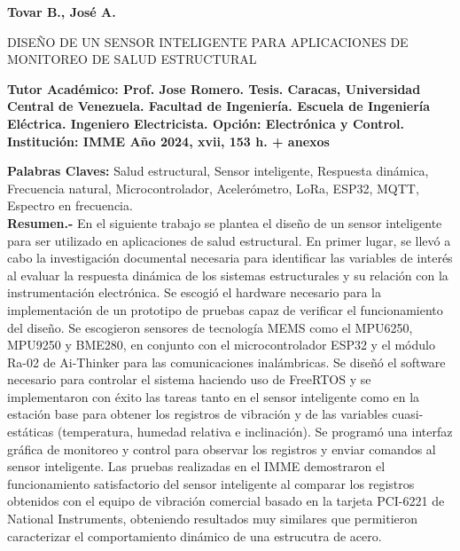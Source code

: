 \documentclass[letterpaper,titlepage,12pt,oneside,spanish,final]{report_eie}
\begin{document}
\newpage
\renewcommand*{\abstract}{\begin{center}\end{center}}
\begin{spacing}{1}
\begin{center}%

\textbf{Tovar B., José A.}

\begin{large}
DISEÑO DE UN SENSOR INTELIGENTE PARA APLICACIONES DE MONITOREO DE SALUD ESTRUCTURAL
\end{large}
\end{center}

\noindent%
\textbf{Tutor Académico: Prof. Jose Romero. Tesis.
Caracas, Universidad Central de Venezuela. Facultad de Ingeniería.
Escuela de Ingeniería Eléctrica. Ingeniero Electricista. Opción: Electrónica y Control. Institución: IMME Año 2024,
xvii, 153 h. + anexos}

\noindent
\textbf{Palabras Claves:} Salud estructural, Sensor inteligente,  Respuesta dinámica, Frecuencia natural, Microcontrolador, Acelerómetro, LoRa, ESP32, MQTT, Espectro en frecuencia. \\[1ex]

\noindent \textbf{Resumen.-} En el siguiente trabajo se plantea el diseño de un sensor inteligente para ser utilizado en aplicaciones de salud estructural. En primer lugar, se llevó a cabo la investigación documental necesaria para identificar las variables de interés al evaluar la respuesta dinámica de los sistemas estructurales y su relación con la instrumentación electrónica. Se escogió el hardware necesario para la implementación de un prototipo de pruebas capaz de verificar el funcionamiento del diseño. Se escogieron sensores de tecnología MEMS como el MPU6250, MPU9250 y BME280, en conjunto con el microcontrolador ESP32 y el módulo Ra-02 de Ai-Thinker para las comunicaciones inalámbricas. Se diseñó el software necesario para controlar el sistema haciendo uso de FreeRTOS y se implementaron con éxito las tareas tanto en el sensor inteligente como en la estación base para obtener los registros de vibración y de las variables cuasi-estáticas (temperatura, humedad relativa e inclinación). Se programó una interfaz gráfica de monitoreo y control para observar los registros y enviar comandos al sensor inteligente. Las pruebas realizadas en el IMME demostraron el funcionamiento satisfactorio del sensor inteligente al comparar los registros obtenidos con el equipo de vibración comercial basado en la tarjeta PCI-6221 de National Instruments, obteniendo resultados muy similares que permitieron caracterizar el comportamiento dinámico de una estrucutra de acero.

\end{spacing}
\end{document}
